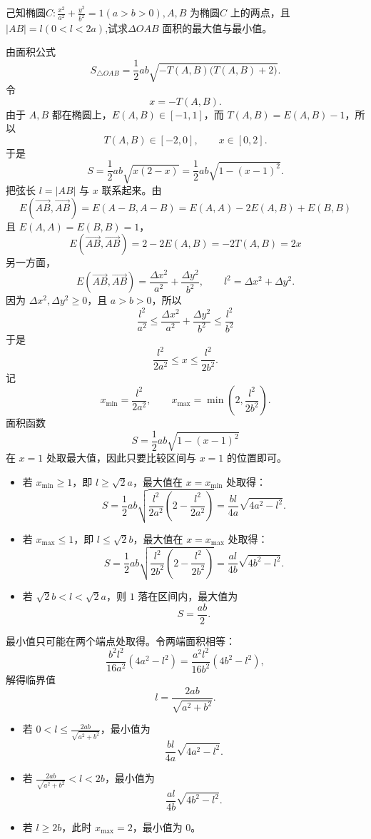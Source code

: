 \begin{exercise}[定弦长面积问题]
 己知椭圆$C:\frac{x^2}{a^2}+\frac{y^2}{b^2}=1(a>b>0),A,B$ 为椭圆$C$ 上的两点，且
$\left|AB\right|=l(0<l<2a)$,试求$\Delta OAB$ 面积的最大值与最小值。
\end{exercise}
\begin{solution}
由面积公式
$$S_{\triangle OAB} = \frac{1}{2}ab\sqrt{-T(A,B)\big(T(A,B)+2\big)}.$$
令
$$x = -T(A,B).$$
由于 $A,B$ 都在椭圆上，$E(A,B)\in[-1,1]$，而 $T(A,B)=E(A,B)-1$，所以
$$T(A,B)\in[-2,0],\qquad x\in[0,2].$$
于是
$$S = \frac{1}{2}ab\sqrt{x(2-x)} = \frac{1}{2}ab\sqrt{1-(x-1)^2}.$$
把弦长 $l=|AB|$ 与 $x$ 联系起来。由
$$E(\overrightarrow{AB}, \overrightarrow{AB}) = E(A-B, A-B) = E(A,A) - 2E(A,B) + E(B,B)$$
且 $E(A,A)=E(B,B)=1$，
$$E(\overrightarrow{AB}, \overrightarrow{AB}) = 2 - 2E(A,B) = -2T(A,B) = 2x$$
另一方面，
$$E(\overrightarrow{AB}, \overrightarrow{AB}) = \frac{\Delta x^2}{a^2} + \frac{\Delta y^2}{b^2},\qquad l^2 = \Delta x^2 + \Delta y^2.$$
因为 $\Delta x^2,\Delta y^2 \ge 0$，且 $a>b>0$，所以
$$\frac{l^2}{a^2} \leq \frac{\Delta x^2}{a^2} + \frac{\Delta y^2}{b^2} \leq \frac{l^2}{b^2}$$
于是
$$\frac{l^2}{2a^2} \leq x \leq \frac{l^2}{2b^2}.$$
记
$$x_{\min} = \frac{l^2}{2a^2},\qquad x_{\max} = \min\left(2, \frac{l^2}{2b^2}\right).$$
面积函数
$$S = \frac{1}{2}ab\sqrt{1-(x-1)^2}$$
在 $x=1$ 处取最大值，因此只要比较区间与 $x=1$ 的位置即可。
\begin{itemize}
\item 若 $x_{\min} \geq 1$，即 $l \geq \sqrt{2}a$，最大值在 $x=x_{\min}$ 处取得：
$$S = \frac{1}{2}ab\sqrt{\frac{l^2}{2a^2}\left(2 - \frac{l^2}{2a^2}\right)} = \frac{bl}{4a}\sqrt{4a^2 - l^2}.$$
\item 若 $x_{\max} \leq 1$，即 $l \leq \sqrt{2}b$，最大值在 $x=x_{\max}$ 处取得：
$$S = \frac{1}{2}ab\sqrt{\frac{l^2}{2b^2}\left(2 - \frac{l^2}{2b^2}\right)} = \frac{al}{4b}\sqrt{4b^2 - l^2}.$$
\item 若 $\sqrt{2}b < l < \sqrt{2}a$，则 $1$ 落在区间内，最大值为
$$S = \frac{ab}{2}.$$
\end{itemize}
最小值只可能在两个端点处取得。令两端面积相等：
$$\frac{b^2l^2}{16a^2}(4a^2 - l^2) = \frac{a^2l^2}{16b^2}(4b^2 - l^2),$$
解得临界值
$$l = \frac{2ab}{\sqrt{a^2+b^2}}.$$
\begin{itemize}
\item 若 $0 < l \leq \frac{2ab}{\sqrt{a^2+b^2}}$，最小值为
$$\frac{bl}{4a}\sqrt{4a^2 - l^2}.$$
\item 若 $\frac{2ab}{\sqrt{a^2+b^2}} < l < 2b$，最小值为
$$\frac{al}{4b}\sqrt{4b^2 - l^2}.$$
\item 若 $l \geq 2b$，此时 $x_{\max}=2$，最小值为 $0$。

\end{itemize}
\end{solution}
